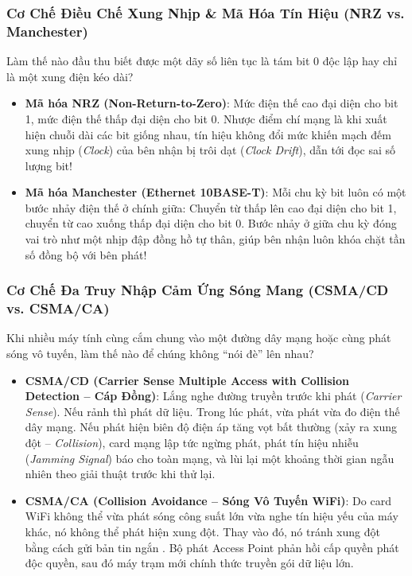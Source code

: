 \subsubsection{Cơ Chế Điều Chế Xung Nhịp \& Mã Hóa Tín Hiệu (NRZ vs. Manchester)}
Làm thế nào đầu thu biết được một dãy số  liên tục là tám bit 0 độc lập hay chỉ là một xung điện kéo dài? 
\begin{itemize}
  \item \textbf{Mã hóa NRZ (Non-Return-to-Zero)}: Mức điện thế cao đại diện cho bit 1, mức điện thế thấp đại diện cho bit 0. Nhược điểm chí mạng là khi xuất hiện chuỗi dài các bit giống nhau, tín hiệu không đổi mức khiến mạch đếm xung nhịp (\textit{Clock}) của bên nhận bị trôi dạt (\textit{Clock Drift}), dẫn tới đọc sai số lượng bit!
  \item \textbf{Mã hóa Manchester (Ethernet 10BASE-T)}: Mỗi chu kỳ bit luôn có một bước nhảy điện thế ở chính giữa: Chuyển từ thấp lên cao đại diện cho bit 1, chuyển từ cao xuống thấp đại diện cho bit 0. Bước nhảy ở giữa chu kỳ đóng vai trò như một nhịp đập đồng hồ tự thân, giúp bên nhận luôn khóa chặt tần số đồng bộ với bên phát!
\end{itemize}

\subsubsection{Cơ Chế Đa Truy Nhập Cảm Ứng Sóng Mang (CSMA/CD vs. CSMA/CA)}
Khi nhiều máy tính cùng cắm chung vào một đường dây mạng hoặc cùng phát sóng vô tuyến, làm thế nào để chúng không ``nói đè'' lên nhau?
\begin{itemize}
  \item \textbf{CSMA/CD (Carrier Sense Multiple Access with Collision Detection -- Cáp Đồng)}: Lắng nghe đường truyền trước khi phát (\textit{Carrier Sense}). Nếu rảnh thì phát dữ liệu. Trong lúc phát, vừa phát vừa đo điện thế dây mạng. Nếu phát hiện biên độ điện áp tăng vọt bất thường (xảy ra xung đột -- \textit{Collision}), card mạng lập tức ngừng phát, phát tín hiệu nhiễu (\textit{Jamming Signal}) báo cho toàn mạng, và lùi lại một khoảng thời gian ngẫu nhiên theo giải thuật  trước khi thử lại.
  \item \textbf{CSMA/CA (Collision Avoidance -- Sóng Vô Tuyến WiFi)}: Do card WiFi không thể vừa phát sóng công suất lớn vừa nghe tín hiệu yếu của máy khác, nó không thể phát hiện xung đột. Thay vào đó, nó tránh xung đột bằng cách gửi bản tin ngắn . Bộ phát Access Point phản hồi  cấp quyền phát độc quyền, sau đó máy trạm mới chính thức truyền gói dữ liệu lớn.
\end{itemize}

